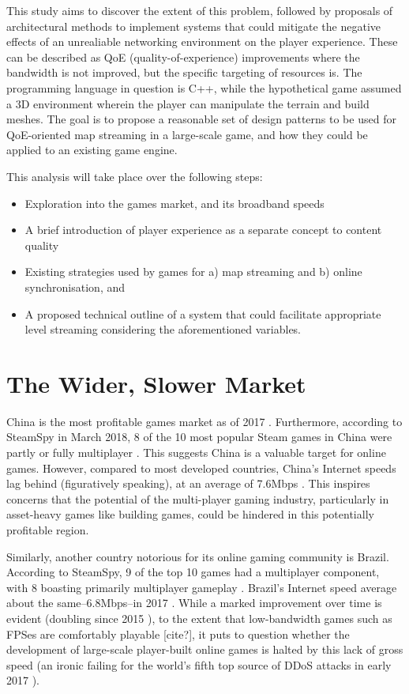 \documentclass{scrartcl}
\begin{document}
This study aims to discover the extent of this problem, followed by proposals of architectural methods to implement systems that could mitigate the negative effects of an unrealiable networking environment on the player experience. These can be described as QoE (quality-of-experience) improvements where the bandwidth is not improved, but the specific targeting of resources is. The programming language in question is C++, while the hypothetical game assumed a 3D environment wherein the player can manipulate the terrain and build meshes. The goal is to propose a reasonable set of design patterns to be used for QoE-oriented map streaming in a large-scale game, and how they could be applied to an existing game engine.

This analysis will take place over the following steps:
\begin{itemize}
\item Exploration into the games market, and its broadband speeds
\item A brief introduction of player experience as a separate concept to content quality
\item Existing strategies used by games for a) map streaming and b) online synchronisation, and
\item A proposed technical outline of a system that could facilitate appropriate level streaming considering the aforementioned variables.
\end{itemize}

\section{The Wider, Slower Market}
China is the most profitable games market as of 2017 \cite{chinamarket}. Furthermore, according to SteamSpy in March 2018, 8 of the 10 most popular Steam games in China were partly or fully multiplayer \cite{steamchina}. This suggests China is a valuable target for online games. However, compared to most developed countries, China's Internet speeds lag behind (figuratively speaking), at an average of 7.6Mbps \cite{webspeeds}. This inspires concerns that the potential of the multi-player gaming industry, particularly in asset-heavy games like building games, could be hindered in this potentially profitable region.

Similarly, another country notorious for its online gaming community is Brazil. According to SteamSpy, 9 of the top 10 games had a multiplayer component, with 8 boasting primarily multiplayer gameplay \cite{steambrazil}. Brazil's Internet speed average about the same--6.8Mbps--in 2017 \cite{webspeeds}. While a marked improvement over time is evident (doubling since 2015 \cite{webspeeds2015}), to the extent that low-bandwidth games such as FPSes are comfortably playable [cite?], it puts to question whether the development of large-scale player-built online games is halted by this lack of gross speed (an ironic failing for the world's fifth top source of DDoS attacks in early 2017 \cite{websecurity}).
\end{document}
